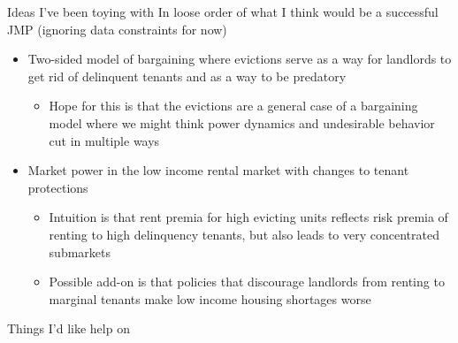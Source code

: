 \documentclass[10pt, xcolor=dvipsnames]{beamer}
\begin{document}
\begin{frame}{Ideas I've been toying with}
In loose order of what I think would be a successful JMP (ignoring data constraints for now)
\bigskip
    \begin{itemize}
        \item Two-sided model of bargaining where evictions serve as a way for landlords to get rid of delinquent tenants and as a way to be predatory
        \begin{itemize}
            \item Hope for this is that the evictions are a general case of a bargaining model where we might think power dynamics and undesirable behavior cut in multiple ways
        \end{itemize}
        \item Market power in the low income rental market with changes to tenant protections
        \begin{itemize}
            \item Intuition is that rent premia for high evicting units reflects risk premia of renting to high delinquency tenants, but also leads to very concentrated submarkets
            \item Possible add-on is that policies that discourage landlords from renting to marginal tenants make low income housing shortages worse
        \end{itemize}
    \end{itemize}
    
\end{frame}

\begin{frame}{Things I'd like help on}
\end{frame}
    

    
\end{document}
